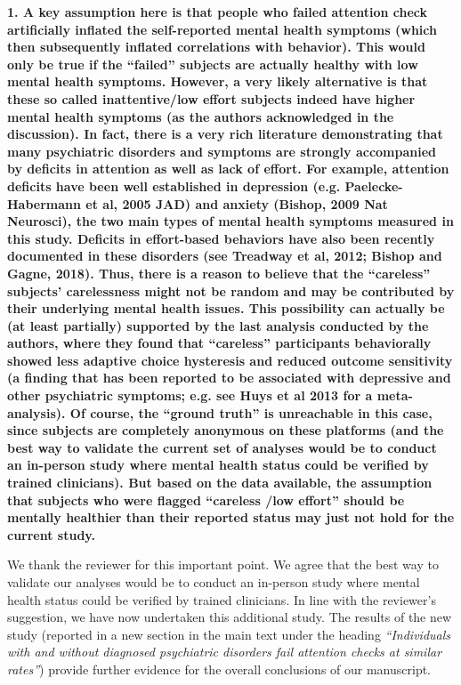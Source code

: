 \documentclass[a4paper,notitlepage,12pt]{article}
\begin{document}
\textbf{1. A key assumption here is that people who failed attention check artificially inflated the self-reported mental health symptoms (which then subsequently inflated correlations with behavior). This would only be true if the ``failed'' subjects are actually healthy with low mental health symptoms. However, a very likely alternative is that these so called inattentive/low effort subjects indeed have higher mental health symptoms (as the authors acknowledged in the discussion). In fact, there is a very rich literature demonstrating that many psychiatric disorders and symptoms are strongly accompanied by deficits in attention as well as lack of effort. For example, attention deficits have been well established in depression (e.g. Paelecke-Habermann et al, 2005 JAD) and anxiety (Bishop, 2009 Nat Neurosci), the two main types of mental health symptoms measured in this study. Deficits in effort-based behaviors have also been recently documented in these disorders (see Treadway et al, 2012; Bishop and Gagne, 2018). Thus, there is a reason to believe that the ``careless'' subjects' carelessness might not be random and may be contributed by their underlying mental health issues. This possibility can actually be (at least partially) supported by the last analysis conducted by the authors, where they found that ``careless'' participants behaviorally showed less adaptive choice hysteresis and reduced outcome sensitivity (a finding that has been reported to be associated with depressive and other psychiatric symptoms; e.g. see Huys et al 2013 for a meta-analysis). Of course, the ``ground truth'' is unreachable in this case, since subjects are completely anonymous on these platforms (and the best way to validate the current set of analyses would be to conduct an in-person study where mental health status could be verified by trained clinicians). But based on the data available, the assumption that subjects who were flagged ``careless /low effort'' should be mentally healthier than their reported status may just not hold for the current study.}

We thank the reviewer for this important point. We agree that the best way to validate our analyses would be to conduct an in-person study where mental health status could be verified by trained clinicians. In line with the reviewer's suggestion, we have now undertaken this additional study. The results of the new study (reported in a new section in the main text under the heading \textit{``Individuals with and without diagnosed psychiatric disorders fail attention checks at similar rates''}) provide further evidence for the overall conclusions of our manuscript.
\end{document}
